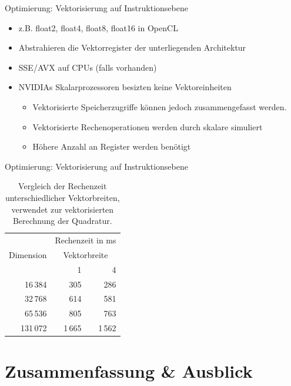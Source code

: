 \documentclass[10pt]{beamer}
\begin{document}
\begin{frame}{Optimierung: Vektorisierung auf Instruktionsebene}
  \begin{itemize}
    \item z.B. float2, float4, float8, float16 in OpenCL
    \item Abstrahieren die Vektorregister der unterliegenden Architektur
    \item SSE/AVX auf CPUs (falls vorhanden)
    \item NVIDIAs Skalarprozessoren besizten keine Vektoreinheiten
    \begin{itemize}
      \item Vektorisierte Speicherzugriffe können jedoch zusammengefasst
            werden.
      \item Vektorisierte Rechenoperationen werden durch skalare simuliert
      \item Höhere Anzahl an Register werden benötigt
    \end{itemize}
  \end{itemize}
\end{frame}

\begin{frame}{Optimierung: Vektorisierung auf Instruktionsebene}
  \begin{table}[ht]\label{tab:vec}
    \begin{tabular}{rrr} \toprule
      \multirow{3}{*}{Dimension} & \multicolumn{2}{c}{Rechenzeit in ms} \\ 
      \cmidrule{2-3}
      & \multicolumn{2}{c}{Vektorbreite} \\ \cmidrule{2-3}
      & 1 & 4 \\ \midrule
       16\,384 &    305 &    286 \\
       32\,768 &    614 &    581 \\
       65\,536 &    805 &    763 \\
      131\,072 & 1\,665 & 1\,562 \\
      \bottomrule
    \end{tabular}
    \caption{Vergleich der Rechenzeit unterschiedlicher Vektorbreiten, 
             verwendet zur vektorisierten Berechnung der Quadratur.}
  \end{table}
\end{frame}

\section{Zusammenfassung \& Ausblick}
\end{document}
